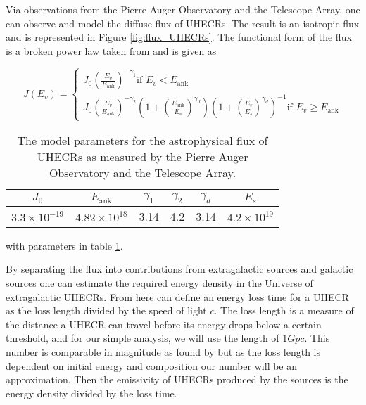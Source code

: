 Via observations from the Pierre Auger Observatory and the Telescope Array, one can observe and model the diffuse flux of UHECRs. The result is an isotropic flux and is represented in Figure \ref{fig:flux_UHECRs}. The functional 
form of the flux is a broken power law taken from \cite{thepierreaugercollaboration2017pierre} and is given as

\begin{equation}
    J(E_v) = \begin{cases} 
        J_0 \left(\frac{E_v}{E_{\text{ank}}}\right)^{-\gamma_1}  \text{if } E_v < E_{\text{ank}} \\
        J_0 \left(\frac{E_v}{E_{\text{ank}}}\right)^{-\gamma_2} \left(1 + \left(\frac{E_{\text{ank}}}{E_s}\right)^{\gamma_d}\right) \left(1 + \left(\frac{E_v}{E_s}\right)^{\gamma_d}\right)^{-1}   \text{if } E_v \geq E_{\text{ank}}
    \end{cases}
\end{equation}

\begin{table}
    \centering
    \begin{tabular}{|c|c|c|c|c|c|}
        \hline
        $J_0$ & $E_{\text{ank}}$ & $\gamma_1$ & $\gamma_2$ &$\gamma_d$& $E_s$\\
        \hline
        $3.3 \times 10^{-19} $ & $4.82\times 10^{18}$ & 3.14  & 4.2 & 3.14& $4.2 \times 10^{19}$  \\
        \hline
    \end{tabular}
    \caption{The model parameters for the astrophysical flux of UHECRs as measured by the Pierre Auger Observatory and the Telescope Array.}
    \label{tab:UHECR_flux}
\end{table}

with parameters in table \ref{tab:UHECR_flux}. 


By separating the 
flux into contributions from extragalactic sources and galactic sources one can estimate the required energy density in the Universe of extragalactic UHECRs. From here can define an energy loss time for a UHECR as the loss length divided by the speed of light $c$.
 The loss length is a measure of the distance a UHECR can travel before its energy drops below a certain threshold, and for our simple analysis, we will use the length of $1 Gpc$. This number is comparable in magnitude
as found by \cite{Stanev_2009} but as the loss length is dependent on initial energy and composition our number will be an approximation. 
Then the emissivity of UHECRs produced by the sources is the energy density divided by the loss time.

